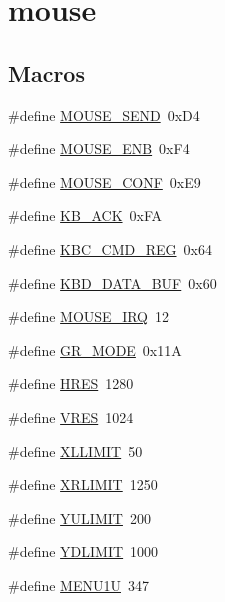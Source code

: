 \hypertarget{group__mouse}{}\section{mouse}
\label{group__mouse}
\subsection*{Macros}
\begin{DoxyCompactItemize}
\item 
\#define \hyperlink{group__mouse_gaf5b75ec709ee94625a79692c87cc7b7a}{M\+O\+U\+S\+E\+\_\+\+S\+E\+ND}~0x\+D4
\item 
\#define \hyperlink{group__mouse_ga7c88f18c3c70a4afefba1a8f772c7036}{M\+O\+U\+S\+E\+\_\+\+E\+NB}~0x\+F4
\item 
\#define \hyperlink{group__mouse_ga199b8aec1af091ef16f1483d4aa4b345}{M\+O\+U\+S\+E\+\_\+\+C\+O\+NF}~0x\+E9
\item 
\#define \hyperlink{group__mouse_ga0349a2901e942eb948442081d0aedc96}{K\+B\+\_\+\+A\+CK}~0x\+FA
\item 
\#define \hyperlink{group__mouse_ga6d57c7927a10f638c83046b52c8caac9}{K\+B\+C\+\_\+\+C\+M\+D\+\_\+\+R\+EG}~0x64
\item 
\#define \hyperlink{group__mouse_ga95745d05db38ca00871939ef479aeb56}{K\+B\+D\+\_\+\+D\+A\+T\+A\+\_\+\+B\+UF}~0x60
\item 
\#define \hyperlink{group__mouse_ga85964cb90343bb1a029b1d1b4229f910}{M\+O\+U\+S\+E\+\_\+\+I\+RQ}~12
\item 
\#define \hyperlink{group__mouse_ga0e16a37e9b19ac48591b3899fc7580ea}{G\+R\+\_\+\+M\+O\+DE}~0x11A
\item 
\#define \hyperlink{group__mouse_ga327c2a8d523460fa45ca05492a003d56}{H\+R\+ES}~1280
\item 
\#define \hyperlink{group__mouse_gacf2cfe6990fa35811b2a0b2f4b77bbdb}{V\+R\+ES}~1024
\item 
\#define \hyperlink{group__mouse_gaee3d3431c33559daa9472d32dbaa76cc}{X\+L\+L\+I\+M\+IT}~50
\item 
\#define \hyperlink{group__mouse_gaccc38829dd9a253af163a2e05124d239}{X\+R\+L\+I\+M\+IT}~1250
\item 
\#define \hyperlink{group__mouse_ga7afa9a9c3f789856869ae1a766cc917f}{Y\+U\+L\+I\+M\+IT}~200
\item 
\#define \hyperlink{group__mouse_gaec42b751ff3806b4f7102f7564fdf34d}{Y\+D\+L\+I\+M\+IT}~1000
\item 
\#define \hyperlink{group__mouse_ga4a627ba1f66cbd6c5de585d5002ebe96}{M\+E\+N\+U1U}~347

\end{DoxyCompactItemize}
